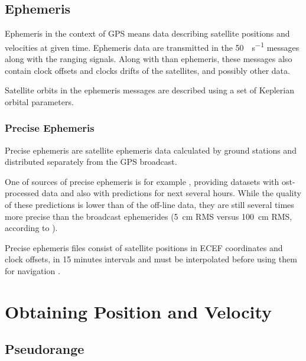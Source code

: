 

\subsection{Ephemeris}
\label{sec:gps-ephemeris}

Ephemeris in the context of GPS means data describing satellite positions and velocities
at given time.
Ephemeris data are transmitted in the \SI{50}{\bit\per\second} messages along with the ranging signals.
Along with than ephemeris, these messages also contain clock offsets and clocks drifts of the satellites,
and possibly other data.

Satellite orbits in the ephemeris messages are described using a set of Keplerian orbital parameters.

\subsubsection{Precise Ephemeris}
Precise ephemeris are satellite ephemeris data calculated by ground stations
and distributed separately from the GPS broadcast.

One of sources of precise ephemeris is for example \cite{orbit-data}, providing datasets with
ost-processed data and also with predictions for next several hours.
While the quality of these predictions is lower than of the off-line data,
they are still several times more precise than the broadcast ephemerides
(\SI{5}{\centi\meter} RMS versus \SI{100}{\centi\meter} RMS, according to \cite{orbit-data}).

Precise ephemeris files consist of satellite positions in ECEF
coordinates and clock offsets, in 15 minutes intervals and must be interpolated
before using them for navigation \cite{schenewerk03}.

\section{Obtaining Position and Velocity}


\subsection{Pseudorange}
\label{sec:pseudorange}


